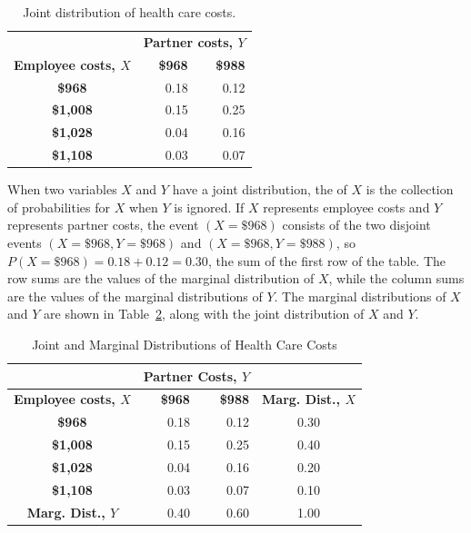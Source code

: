 \begin{table}[h]
	\centering
	\begin{tabular}{crr}
		\hline
		&   \multicolumn{2}{c}{\textbf{Partner costs, $Y$}} \\
		\textbf{Employee costs, $X$} & \textbf{\$968} & \textbf{\$988} \\ 
		\hline
		\textbf{\$968} & 0.18 & 0.12 \\ 
		\textbf{\$1,008} & 0.15 & 0.25 \\ 
		\textbf{\$1,028}  & 0.04 & 0.16 \\ 
		\textbf{\$1,108}  & 0.03 & 0.07 \\ 
		\hline
	\end{tabular}
	\caption{Joint distribution of health care costs.} 
	\label{healthExpensesJointDistribution}
\end{table}

When two variables $X$ and $Y$ have a joint distribution, the  of $X$ is the collection of probabilities for $X$ when $Y$ is ignored.  If $X$ represents employee costs and $Y$ represents partner costs, the event $(X = \$968)$ consists of the two  disjoint events $(X = \$968, Y = \$968)$ and $(X = \$968, Y = \$988)$, so $P(X = \$968) = 0.18 + 0.12 = 0.30$, the sum of the first row of the table. The row sums are the values of the marginal distribution of $X$, while the column sums are the values of the marginal distributions of $Y$. The marginal distributions of $X$ and $Y$ are shown in Table~\ref{healthExpensesJointMarginalDistribution}, along with the joint distribution of $X$ and $Y$.

\begin{table}[h]
	\centering
	\begin{tabular}{c|rr | c}
		&   \multicolumn{2}{c}{\textbf{Partner Costs, $Y$}} & \\
		\hline
		\textbf{Employee costs, $X$} & \textbf{\$968} & \textbf{\$988} &  \textbf{Marg. Dist., $X$} \\ 
		\hline
		\textbf{\$968} & 0.18 & 0.12 & 0.30\\ 
		\textbf{\$1,008} & 0.15 & 0.25 & 0.40 \\ 
		\textbf{\$1,028}  & 0.04 & 0.16 & 0.20\\ 
		\textbf{\$1,108}  & 0.03 & 0.07  & 0.10\\ 
		\hline
		\textbf{Marg. Dist., $Y$} & 0.40 & 0.60 & 1.00 \\
	\end{tabular}
	\caption{Joint and Marginal Distributions of Health Care Costs} 
	\label{healthExpensesJointMarginalDistribution}
\end{table}


